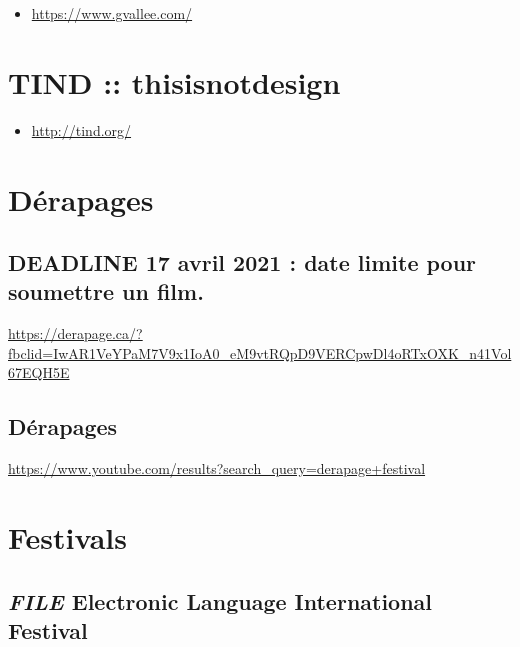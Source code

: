 \documentclass[
  french,
]{book}
\providecommand{\tightlist}{%
  \setlength{\itemsep}{0pt}\setlength{\parskip}{0pt}}
\begin{document}
\begin{itemize}
\tightlist
\item
  \url{https://www.gvallee.com/}
\end{itemize}

\hypertarget{tind-thisisnotdesign}{%
\section{TIND :: thisisnotdesign}\label{tind-thisisnotdesign}}

\begin{itemize}
\tightlist
\item
  \url{http://tind.org/}
\end{itemize}

\hypertarget{duxe9rapages}{%
\section{Dérapages}\label{duxe9rapages}}

\hypertarget{deadline-17-avril-2021-date-limite-pour-soumettre-un-film.}{%
\subsection{DEADLINE 17 avril 2021 : date limite pour soumettre un film.}\label{deadline-17-avril-2021-date-limite-pour-soumettre-un-film.}}

\url{https://derapage.ca/?fbclid=IwAR1VeYPaM7V9x1IoA0_eM9vtRQpD9VERCpwDl4oRTxOXK_n41Vol67EQH5E}

\hypertarget{duxe9rapages-1}{%
\subsection{Dérapages}\label{duxe9rapages-1}}

\url{https://www.youtube.com/results?search_query=derapage+festival}

\hypertarget{festivals}{%
\section{Festivals}\label{festivals}}

\hypertarget{file-electronic-language-international-festival}{%
\subsection{\texorpdfstring{\emph{FILE} Electronic Language International Festival}{FILE Electronic Language International Festival}}\label{file-electronic-language-international-festival}}
\end{document}
